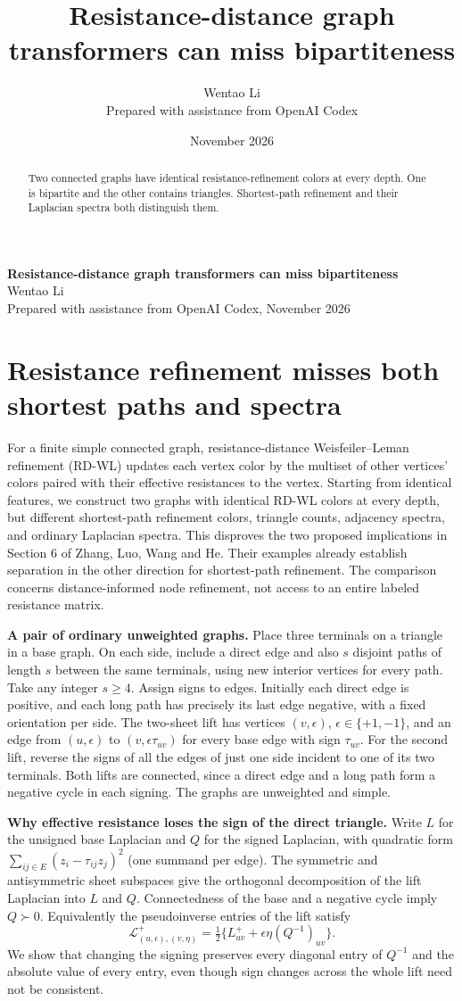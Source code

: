 \documentclass[10pt]{article}
\title{Resistance-distance graph transformers can miss bipartiteness}
\author{Wentao Li\\{\small Prepared with assistance from OpenAI Codex}}
\date{November 2026}
\begin{document}
\begin{center}{\Large\bfseries Resistance-distance graph transformers can miss bipartiteness}\\[3pt]Wentao Li\\{\small Prepared with assistance from OpenAI Codex, November 2026}\end{center}
\begin{abstract}
Two connected graphs have identical resistance-refinement colors at every depth. One is bipartite and the other contains triangles. Shortest-path refinement and their Laplacian spectra both distinguish them.
\end{abstract}
\section*{Resistance refinement misses both shortest paths and spectra}
For a finite simple connected graph, resistance-distance Weisfeiler--Leman refinement (RD-WL) updates each vertex color by the multiset of other vertices' colors paired with their effective resistances to the vertex. Starting from identical features, we construct two graphs with identical RD-WL colors at every depth, but different shortest-path refinement colors, triangle counts, adjacency spectra, and ordinary Laplacian spectra. This disproves the two proposed implications in Section 6 of Zhang, Luo, Wang and He. Their examples already establish separation in the other direction for shortest-path refinement. The comparison concerns distance-informed node refinement, not access to an entire labeled resistance matrix.

\textbf{A pair of ordinary unweighted graphs.} Place three terminals on a triangle in a base graph. On each side, include a direct edge and also $s$ disjoint paths of length $s$ between the same terminals, using new interior vertices for every path. Take any integer $s\ge4$. Assign signs to edges. Initially each direct edge is positive, and each long path has precisely its last edge negative, with a fixed orientation per side. The two-sheet lift has vertices $(v,\epsilon)$, $\epsilon\in\{+1,-1\}$, and an edge from $(u,\epsilon)$ to $(v,\epsilon\tau_{uv})$ for every base edge with sign $\tau_{uv}$. For the second lift, reverse the signs of all the edges of just one side incident to one of its two terminals. Both lifts are connected, since a direct edge and a long path form a negative cycle in each signing. The graphs are unweighted and simple.

\textbf{Why effective resistance loses the sign of the direct triangle.} Write $L$ for the unsigned base Laplacian and $Q$ for the signed Laplacian, with quadratic form $\sum_{ij\in E}(z_i-\tau_{ij}z_j)^2$ (one summand per edge). The symmetric and antisymmetric sheet subspaces give the orthogonal decomposition of the lift Laplacian into $L$ and $Q$. Connectedness of the base and a negative cycle imply $Q\succ0$. Equivalently the pseudoinverse entries of the lift satisfy
\[
 \mathcal L^+_{(u,\epsilon),(v,\eta)}
   =\tfrac12\{L^+_{uv}+\epsilon\eta (Q^{-1})_{uv}\}.
\]
We show that changing the signing preserves every diagonal entry of $Q^{-1}$ and the absolute value of every entry, even though sign changes across the whole lift need not be consistent.
\end{document}
